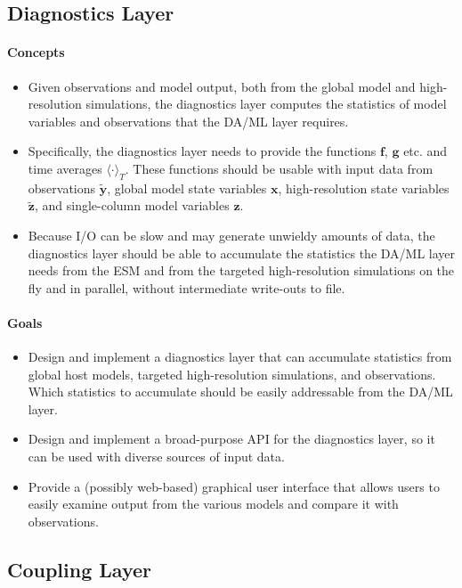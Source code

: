 \documentclass{article}
\renewcommand{\vec}[1]{\boldsymbol{{#1}}}
\begin{document}
\subsection{Diagnostics Layer}

\paragraph{Concepts}
\begin{itemize}
    \item  Given observations and model output, both from the global model and high-resolution simulations, the diagnostics layer computes the statistics of model variables and observations that the DA/ML layer requires.
    \item Specifically, the diagnostics layer needs to provide the functions $\vec{f}$, $\vec{g}$ etc. and time averages $\langle \cdot \rangle_T$. These functions should be usable with input data from observations $\vec{\tilde y}$, global model state variables $\vec{x}$, high-resolution state variables $\vec{\tilde z}$, and single-column model variables $\vec{z}$.
    \item Because I/O can be slow and may generate unwieldy amounts of data, the diagnostics layer should be able to accumulate the statistics the DA/ML layer needs from the ESM and from the targeted high-resolution simulations on the fly and in parallel, without intermediate write-outs to file.
\end{itemize}

\paragraph{Goals}
\begin{itemize}
    \item Design and implement a diagnostics layer that can accumulate statistics from global host models, targeted high-resolution simulations, and observations. Which statistics to accumulate should be easily addressable from the DA/ML layer.
    \item Design and implement a broad-purpose API for the diagnostics layer, so it can be used with diverse sources of input data. 
    \item Provide a (possibly web-based) graphical user interface that allows users to easily examine output from the various models and compare it with observations.
\end{itemize}

\subsection{Coupling Layer}
\end{document}

